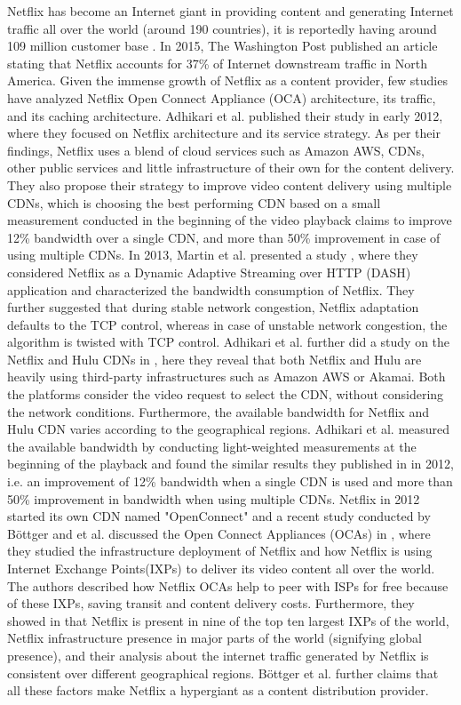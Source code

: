 Netflix has become an Internet giant in providing content and generating Internet traffic all over the world (around 190 countries), it is reportedly having around 109 million customer base \cite{ninanetflix}. In 2015, The Washington Post published an article \cite{washingtonnetflix} stating that Netflix accounts for 37\% of Internet downstream traffic in North America. Given the immense growth of Netflix as a 
content provider, few studies have analyzed Netflix Open Connect Appliance (OCA) architecture, its traffic, and its caching architecture. 
Adhikari et al. \cite{adhikarinetflix} published their study in early 2012, where they focused on Netflix architecture and its service strategy. As per their findings, 
Netflix uses a blend of cloud services such as Amazon AWS, CDNs, other public services and little infrastructure of their own for the content delivery. They also propose their strategy to improve video content delivery using multiple CDNs, which is choosing the best performing CDN based on a small measurement conducted in the beginning of the video playback claims to improve 12\% bandwidth over a single CDN, 
and more than 50\% improvement in case of using multiple CDNs. In 2013, Martin et al. presented a study \cite{martinnetflix}, where they considered Netflix as a Dynamic Adaptive Streaming over HTTP (DASH) application and characterized
the bandwidth consumption of Netflix. They further suggested that during stable network congestion, Netflix adaptation defaults to the TCP control, whereas in case of unstable network congestion, the algorithm is twisted with TCP control.
Adhikari et al. further did a study on the Netflix and Hulu CDNs in \cite{adhikarihulu}, here they reveal that both Netflix and Hulu are heavily using third-party infrastructures such as Amazon AWS or Akamai. Both the platforms consider the
video request to select the CDN, without considering the network conditions. Furthermore, the available bandwidth for Netflix and Hulu CDN varies according to the geographical regions.
Adhikari et al. measured the available bandwidth by conducting light-weighted measurements at the beginning of the playback and found the similar results they published in \cite{adhikarinetflix} in 2012, i.e. 
an improvement of 12\% bandwidth when a single CDN is used and more than 50\% improvement in bandwidth when using multiple CDNs. 
Netflix in 2012 started its own CDN named "OpenConnect" \cite{netflixoca} and a recent study conducted by B{\"o}ttger and et al. 
discussed the Open Connect Appliances (OCAs) in \cite{openconnect}, where they studied the infrastructure deployment of Netflix and how Netflix is using 
Internet Exchange Points(IXPs) to deliver its video content all over the world. The authors described how Netflix OCAs help to peer with ISPs for free because of these IXPs, saving transit and content delivery costs. 
Furthermore, they showed in \cite{openconnect} that Netflix is present in nine of the top ten largest IXPs of the world, Netflix infrastructure presence in major parts of the world (signifying global presence), and their analysis about the internet traffic generated by Netflix is consistent over different geographical regions. B{\"o}ttger et al. further claims that all these factors make Netflix a hypergiant as a content distribution provider.
 

